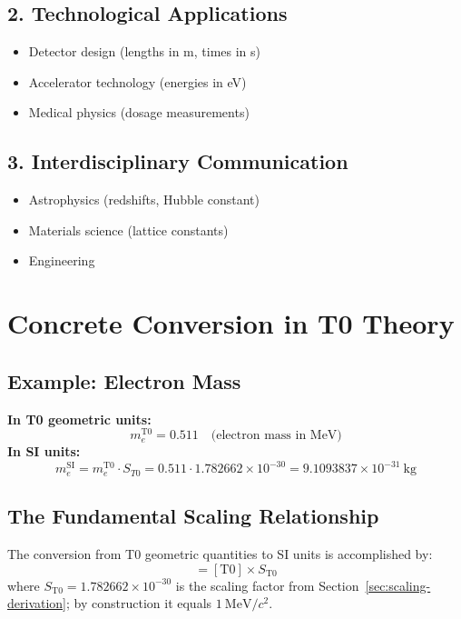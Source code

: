 	\subsection{2. Technological Applications}
	\begin{itemize}
		\item Detector design (lengths in m, times in s)
		\item Accelerator technology (energies in eV)
		\item Medical physics (dosage measurements)
	\end{itemize}
	
	\subsection{3. Interdisciplinary Communication}
	\begin{itemize}
		\item Astrophysics (redshifts, Hubble constant)
		\item Materials science (lattice constants)
		\item Engineering
	\end{itemize}
	
	\section{Concrete Conversion in T0 Theory}
	\label{sec:umrechnung}
	
	\subsection{Example: Electron Mass}
	\textbf{In T0 geometric units:}
	\begin{equation}
		m_e^{\mathrm{T0}} = 0.511 \quad \text{(electron mass in MeV)}
	\end{equation}
	\textbf{In SI units:}
	\begin{equation}
		m_e^{\mathrm{SI}} = m_e^{\mathrm{T0}} \cdot S_{T0} = 0.511 \cdot 1.782662 \times 10^{-30} = 9.1093837 \times 10^{-31}~\mathrm{kg}
	\end{equation}
	
	\subsection{The Fundamental Scaling Relationship}
	The conversion from T0 geometric quantities to SI units is accomplished by:
	\begin{equation}
		[\mathrm{SI}] = [\mathrm{T0}] \times S_{\text{T0}}
	\end{equation}
	where $S_{\text{T0}} = 1.782662 \times 10^{-30}$ is the scaling factor from Section~\ref{sec:scaling-derivation}; by construction it equals $1~\mathrm{MeV}/c^2$.
	
